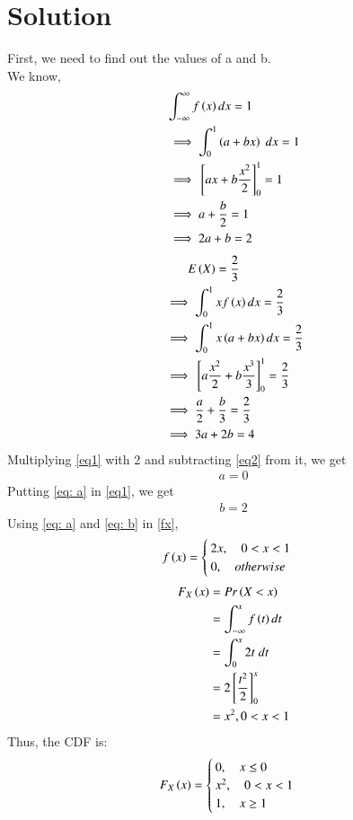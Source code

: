\documentclass[journal,12pt,twocolumn]{IEEEtran}
\begin{document}
\section{Solution}
First, we need to find out the values of a and b.\\
We know,
\begin{align}
    & \int_{-\infty}^{\infty} f\left(x\right) dx =1\\
    &\implies \int_0^1 \left(a+bx\right) \; dx = 1\\
    &\implies {}\left[ax + b\frac{x^2}{2}\right]_0^1 = 1\\
    &\implies a + \frac{b}{2} = 1\\
    &\implies 2a +b = 2 \label{eq1}
\end{align}
\begin{align}
    & \quad \quad E\left(X\right) = \frac{2}{3}\\
    &\implies \int_0^1 x f\left(x\right) dx = \frac{2}{3} \\
    &\implies \int_0^1 x\left(a + bx\right) dx = \frac{2}{3}\\
    &\implies {}\left[a\frac{x^2}{2}+ b\frac{x^3}{3}\right]_0^1 = \frac{2}{3}\\
    &\implies{\frac{a}{2}+ \frac{b}{3}} = \frac{2}{3}\\
    &\implies 3a + 2b = 4 \label{eq2}
\end{align}
Multiplying \eqref{eq1} with 2 and subtracting \eqref{eq2} from it, we get
\begin{align}
    a = 0\label{eq: a}
\end{align}
Putting \eqref{eq: a} in \eqref{eq1}, we get
\begin{align}
     b=2 \label{eq: b}
\end{align}
Using \eqref{eq: a} and \eqref{eq: b} in \eqref{fx},
\begin{align}
    f\left(x\right)  = 
    \begin{cases}
    2x  , \quad 0<x<1 \\
    0, \quad otherwise
    \end{cases}
\end{align}
\begin{align}
    F_X\left(x\right) &= Pr\left(X <x\right)\\
    &=\int_{-\infty}^{x} f\left(t\right) dt\\
    &= \int_0^x 2t \; dt\\
    &= 2{}\left[\frac{t^2}{2}\right]_0^x\\
    &= x^2, 0<x<1
\end{align}
Thus, the CDF is:
\begin{align}
    F_X\left(x\right) =
    \begin{cases}
    0, \quad x\le 0\\
    x^2,\quad 0<x<1\\
    1, \quad x\ge 1
    \end{cases}
\end{align}
\end{document}
